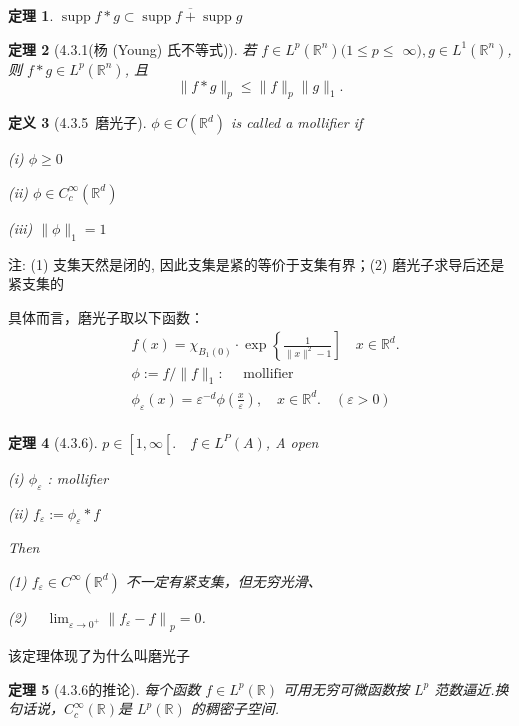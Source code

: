\documentclass[10pt,openany]{book}
\theoremstyle{thmstyle} %
\newtheorem{theorem}{定理}[chapter]
\theoremstyle{defstyle} %
\newtheorem{definition}[theorem]{定义}
\theoremstyle{prostyle} %
\begin{document}
\begin{theorem}
$ \operatorname{supp} f * g \subset \overline{\operatorname{supp} f+\operatorname{supp} g} $
\end{theorem}


\begin{theorem}[4.3.1(杨 (Young) 氏不等式)]
若 $f \in L^p\left(\mathbb{R}^n\right)(1 \leq p \leq$ $\infty), g \in L^1\left(\mathbb{R}^n\right)$, 则 $f * g \in L^p\left(\mathbb{R}^n\right)$, 且
$$
\|f * g\|_p \leq\|f\|_p\|g\|_1 .
$$
\end{theorem}

\begin{definition}[4.3.5~磨光子]
$\phi \in C\left(\mathbb{R}^d\right)$ is called a mollifier if

(i) $\phi \geqslant 0$

(ii) $\phi \in C_c^{\infty}\left(\mathbb{R}^d\right)$

(iii) $\|\phi\|_1=1$
\end{definition}

注: (1) 支集天然是闭的, 因此支集是紧的等价于支集有界；(2) 磨光子求导后还是紧支集的

具体而言，磨光子取以下函数：
$$
\begin{aligned}
& f(x)=\chi_{B_1(0)} \cdot \exp \left\{\frac{1}{\|x\|^2-1}\right] \quad x \in \mathbb{R}^d . \\
& \phi:=f /\|f\|_1: \quad \text { mollifier } \\
& \phi_{\varepsilon}(x)=\varepsilon^{-d} \phi\left(\frac{x}{\varepsilon}\right), \quad x \in \mathbb{R}^d . \quad(\varepsilon>0) \\
&
\end{aligned}
$$

\begin{theorem}[4.3.6]
$p \in\left[1, \infty\left[. \quad f \in L^P(A)\right.\right.$, A open 

(i) $\phi_{\varepsilon}$ : mollifier

(ii) $f_{\varepsilon}:=\phi_{\varepsilon} * f$

Then

(1) $f_{\varepsilon} \in C^{\infty}\left(\mathbb{R}^d\right)$ 不一定有紧支集，但无穷光滑、

(2) $\quad \lim _{\varepsilon \rightarrow 0^{+}}\left\|f_{\varepsilon}-f\right\|_p=0$.
\end{theorem}

该定理体现了为什么叫磨光子


\begin{theorem}[4.3.6的推论]
每个函数 $f \in L^p(\mathbb{R})$ 可用无穷可微函数按 $L^p$ 范数逼近.换句话说，$C_c^\infty(\mathbb{R})$是 $L^p(\mathbb{R})$ 的稠密子空间.
\end{theorem}
\end{document}
